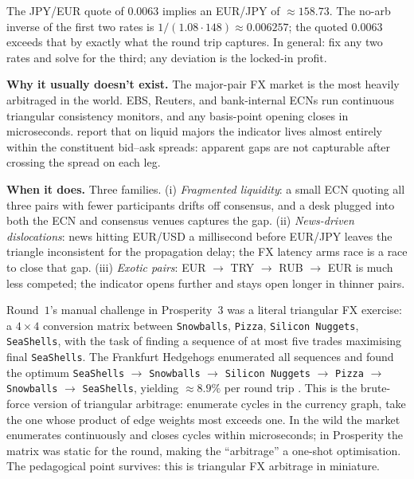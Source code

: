 The JPY/EUR quote of $0.0063$ implies an EUR/JPY of $\approx
158.73$. The no-arb inverse of the first two rates is
$1/(1.08 \cdot 148) \approx 0.006257$; the quoted $0.0063$
exceeds that by exactly what the round trip captures. In
general: fix any two rates and solve for the third; any
deviation is the locked-in profit.

\textbf{Why it usually doesn't exist.} The major-pair FX market
is the most heavily arbitraged in the world. EBS, Reuters, and
bank-internal ECNs run continuous triangular consistency
monitors, and any basis-point opening closes in microseconds.
\citeBouchaud{} report that on liquid majors the indicator lives
almost entirely within the constituent bid--ask spreads:
apparent gaps are not capturable after crossing the spread on
each leg.

\textbf{When it does.} Three families. (i) \emph{Fragmented
liquidity}: a small ECN quoting all three pairs with fewer
participants drifts off consensus, and a desk plugged into both
the ECN and consensus venues captures the gap. (ii)
\emph{News-driven dislocations}: news hitting EUR/USD a
millisecond before EUR/JPY leaves the triangle inconsistent for
the propagation delay; the FX latency arms race is a race to
close that gap. (iii) \emph{Exotic pairs}: EUR $\to$ TRY $\to$
RUB $\to$ EUR is much less competed; the indicator opens further
and stays open longer in thinner pairs.

\begin{prosperitybox}
Round~$1$'s manual challenge in Prosperity~$3$ was a literal
triangular FX exercise: a $4 \times 4$ conversion matrix between
\texttt{Snowballs}, \texttt{Pizza}, \texttt{Silicon Nuggets},
\texttt{SeaShells}, with the task of finding a sequence of at
most five trades maximising final \texttt{SeaShells}. The
Frankfurt Hedgehogs enumerated all sequences and found the
optimum \texttt{SeaShells} $\to$ \texttt{Snowballs} $\to$
\texttt{Silicon Nuggets} $\to$ \texttt{Pizza} $\to$
\texttt{Snowballs} $\to$ \texttt{SeaShells}, yielding $\approx
8.9\%$ per round trip \citep{frankfurtHedgehogs2025imcP3}. This
is the brute-force version of triangular arbitrage: enumerate
cycles in the currency graph, take the one whose product of edge
weights most exceeds one. In the wild the market enumerates
continuously and closes cycles within microseconds; in
Prosperity the matrix was static for the round, making the
``arbitrage'' a one-shot optimisation. The pedagogical point
survives: this is triangular FX arbitrage in miniature.
\end{prosperitybox}


